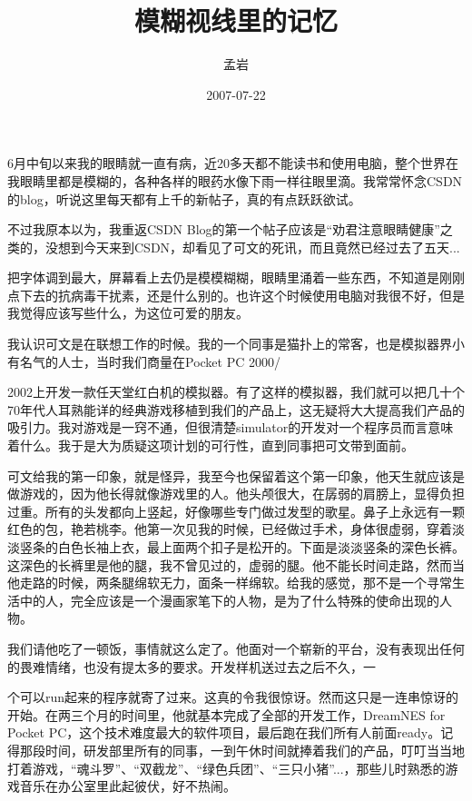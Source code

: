 \documentclass{article}
\title{模糊视线里的记忆}
\author{孟岩}
\date{2007-07-22}
\begin{document}

\maketitle


\Large

﻿6月中旬以来我的眼睛就一直有病，近20多天都不能读书和使用电脑，整个世界在我眼睛里都是模糊的，各种各样的眼药水像下雨一样往眼里滴。我常常怀念CSDN的blog，听说这里每天都有上千的新帖子，真的有点跃跃欲试。

不过我原本以为，我重返CSDN Blog的第一个帖子应该是“劝君注意眼睛健康”之类的，没想到今天来到CSDN，却看见了可文的死讯，而且竟然已经过去了五天...

把字体调到最大，屏幕看上去仍是模模糊糊，眼睛里涌着一些东西，不知道是刚刚点下去的抗病毒干扰素，还是什么别的。也许这个时候使用电脑对我很不好，但是我觉得应该写些什么，为这位可爱的朋友。

我认识可文是在联想工作的时候。我的一个同事是猫扑上的常客，也是模拟器界小有名气的人士，当时我们商量在Pocket PC 2000/

\newpage 

2002上开发一款任天堂红白机的模拟器。有了这样的模拟器，我们就可以把几十个70年代人耳熟能详的经典游戏移植到我们的产品上，这无疑将大大提高我们产品的吸引力。我对游戏是一窍不通，但很清楚simulator的开发对一个程序员而言意味着什么。我于是大为质疑这项计划的可行性，直到同事把可文带到面前。

可文给我的第一印象，就是怪异，我至今也保留着这个第一印象，他天生就应该是做游戏的，因为他长得就像游戏里的人。他头颅很大，在孱弱的肩膀上，显得负担过重。所有的头发都向上竖起，好像哪些专门做过发型的歌星。鼻子上永远有一颗红色的包，艳若桃李。他第一次见我的时候，已经做过手术，身体很虚弱，穿着淡淡竖条的白色长袖上衣，最上面两个扣子是松开的。下面是淡淡竖条的深色长裤。这深色的长裤里是他的腿，我不曾见过的，虚弱的腿。他不能长时间走路，然而当他走路的时候，两条腿绵软无力，面条一样绵软。给我的感觉，那不是一个寻常生活中的人，完全应该是一个漫画家笔下的人物，是为了什么特殊的使命出现的人物。

我们请他吃了一顿饭，事情就这么定了。他面对一个崭新的平台，没有表现出任何的畏难情绪，也没有提太多的要求。开发样机送过去之后不久，一

\newpage 

个可以run起来的程序就寄了过来。这真的令我很惊讶。然而这只是一连串惊讶的开始。在两三个月的时间里，他就基本完成了全部的开发工作，DreamNES for Pocket PC，这个技术难度最大的软件项目，最后跑在我们所有人前面ready。记得那段时间，研发部里所有的同事，一到午休时间就捧着我们的产品，叮叮当当地打着游戏，“魂斗罗”、“双截龙”、“绿色兵团”、“三只小猪”...，那些儿时熟悉的游戏音乐在办公室里此起彼伏，好不热闹。
\end{document}
